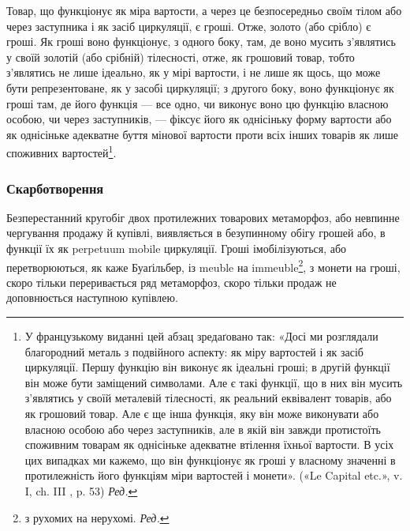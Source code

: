 Товар, що функціонує як міра вартости, а через це безпосередньо
своїм тілом або через заступника і як засіб циркуляції,
є гроші. Отже, золото (або срібло) є гроші. Як гроші воно функціонує,
з одного боку, там, де воно мусить з’являтись у своїй
золотій (або срібній) тілесності, отже, як грошовий товар, тобто
з’являтись не лише ідеально, як у мірі вартости, і не лише як
щось, що може бути репрезентоване, як у засобі циркуляції;
з другого боку, воно функціонує як гроші там, де його функція —
все одно, чи виконує воно цю функцію власною особою, чи через
заступників, — фіксує його як однісіньку форму вартости або як
однісіньке адекватне буття мінової вартости проти всіх інших
товарів як лише споживних вартостей\footnote*{
У французькому виданні цей абзац зредаґовано так: «Досі ми розглядали
благородний металь з подвійного аспекту: як міру вартостей і як засіб циркуляції.
Першу функцію він виконує як ідеальні гроші;
в другій функції він може бути заміщений символами. Але є такі функції,
що в них він мусить з’являтись у своїй металевій тілесності, як реальний
еквівалент товарів, або як грошовий товар. Але є ще інша функція, яку він
може виконувати або власною особою або через заступників, але в якій
він завжди протистоїть споживним товарам як однісіньке адекватне
втілення їхньої вартости. В усіх цих випадках ми кажемо, що він функціонує
як гроші у власному значенні в протилежність його функціям міри
вартостей і монети». («Le Capital etc.», v. I, ch. III , p. 53) \emph{Ред.}
}.

\subsubsection{Скарботворення}

Безперестанний кругобіг двох протилежних товарових метаморфоз,
або невпинне чергування продажу й купівлі, виявляється
в безупинному обігу грошей або, в функції їх як perpetuum mobile
циркуляції. Гроші імобілізуються, або перетворюються, як
каже Буаґільбер, із meuble на immeuble\footnote*{
з рухомих на нерухомі. \emph{Ред.}
}, з монети на гроші,
скоро тільки переривається ряд метаморфоз, скоро тільки продаж
не доповнюється наступною купівлею.

